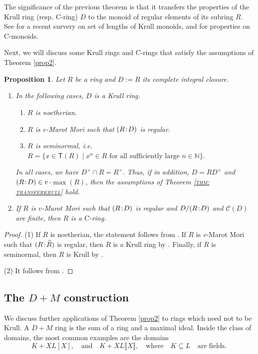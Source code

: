 \documentclass[a4paper, 10pt]{amsart}
\theoremstyle{plain}
\newtheorem{proposition}[theorem]{Proposition}
\theoremstyle{definition}
\theoremstyle{remark}
\newcommand{\N}{\mathbb N}
\newcommand{\DP}{\negthinspace : \negthinspace}
\numberwithin{equation}{section}
\begin{document}
The significance of the previous theorem is that it transfers the properties of the Krull ring (resp. C-ring) $D$ to the monoid  of regular elements of its subring $R.$
See \cite{Sch16} for a recent survery on set of lengths of Krull monoids, and \cite{Oh22, Rei13} for properties on C-monoids.

\smallskip

Next, we will discuss some Krull rings and C-rings that satisfy the assumptions of Theorem \ref{prop2}.

\begin{proposition}\label{prop: crings}
    Let $R$ be a ring and $D:=\widehat{R}$ its complete integral closure.
    \begin{enumerate}[label=\textup(\normalfont\arabic*\textup)]
        \item In the following cases, $D$ is a Krull ring.
            \begin{enumerate}[label=\textup(\normalfont\roman*\textup)]
                \item $R$ is noetherian.
                \item $R$ is $v$-Marot Mori such that $(R\DP D)$ is regular.
                \item $R$ is seminormal, i.e. $R=\{x\in \mathsf{T}(R)\mid x^n\in R \text{ for all sufficiently large } n\in \N\}.$
            \end{enumerate} In all cases, we have $D^\times \cap R=R^\times.$ Thus, if in addition, $D=RD^\times$ and $(R\DP D)\in v$-$\max(R)$, then the assumptions of Theorem \textsc{\ref{thm: transferkrull}} hold.
        \item If $R$ is $v$-Marot Mori such that $(R \DP D)$ is regular and $D/(R \DP  D)$ and $\mathcal C (D)$ are finite, then $R$ is a $\mathrm{C}$-ring.
    \end{enumerate}
\end{proposition}
\begin{proof}
    (1) If $R$ is noetherian, the statement follows from \cite[Theorem 10.1]{Hu88}. If $R$ is $v$-Marot Mori such that $(R\DP \widehat{R})$ is regular, then $R$ is a Krull ring by \cite[Theorem 4.8]{GRR15}. Finally, if $R$ is seminormal, then $R$ is Krull by \cite[Theorem 5.2.8]{HK25}.

    (2) It follows from \cite[Corollary 4.9]{GRR15}.
\end{proof}


\subsection{The $D+M$ construction} We discuss further applications of Theorem \ref{prop2} to rings which need not to be Krull.
 A $D+M$ ring is the sum of a ring and a maximal ideal. Inside the class of domains, the most common examples are the domains \[K+XL[X],\quad \text{and} \quad K+XL\llbracket X \rrbracket,\quad \text{where} \quad K\subseteq L\quad \text{are fields.}\] 
\end{document}
